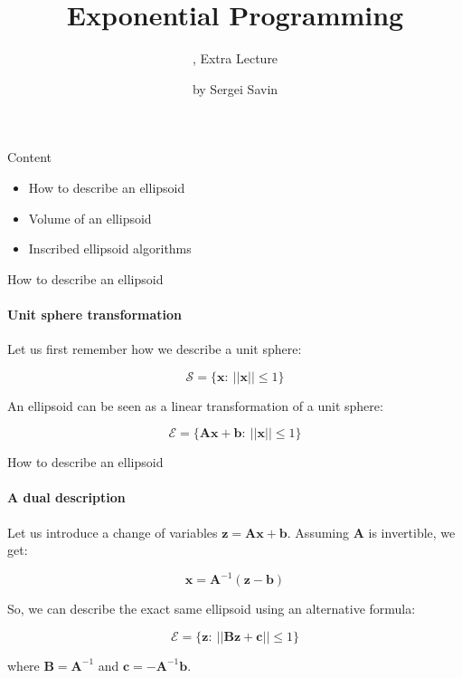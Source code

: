 \documentclass{beamer}
\title{Exponential Programming}
\subtitle{\mycoursetitle, Extra Lecture}
\author{by Sergei Savin}
\date{\mydate}
\begin{document}
\maketitle


\begin{frame}{Content}

\begin{itemize}
\item How to describe an ellipsoid
\item Volume of an ellipsoid
\item Inscribed ellipsoid algorithms
\end{itemize}
\end{frame}





\begin{frame}{How to describe an ellipsoid}
\framesubtitle{Unit sphere transformation}
\begin{flushleft}

Let us first remember how we describe a unit sphere:

\begin{equation}
    \mathcal{S} = \{ \mathbf{x}: \ || \mathbf{x} || \leq 1 \}
\end{equation}

An ellipsoid can be seen as a linear transformation of a unit sphere: 

\begin{equation}
    \mathcal{E} = \{ \mathbf{A}\mathbf{x} + \mathbf{b}: \ || \mathbf{x} || \leq 1 \}
\end{equation}
 
\end{flushleft}
\end{frame}


\begin{frame}{How to describe an ellipsoid}
\framesubtitle{A dual description}
\begin{flushleft}

Let us introduce a change of variables $\mathbf{z} = \mathbf{A}\mathbf{x} + \mathbf{b}$. Assuming $\mathbf{A}$ is invertible, we get:

\begin{equation}
    \mathbf{x} = \mathbf{A}^{-1}(\mathbf{z} - \mathbf{b})
\end{equation}

So, we can describe the exact same ellipsoid using an alternative formula: 

\begin{equation}
    \mathcal{E} = \{ \mathbf{z}: \ || \mathbf{B}\mathbf{z} + \mathbf{c} || \leq 1 \}
\end{equation}
 
 where $\mathbf{B} = \mathbf{A}^{-1}$ and $\mathbf{c} = -\mathbf{A}^{-1}\mathbf{b}$.
 
\end{flushleft}
\end{frame}
\end{document}
